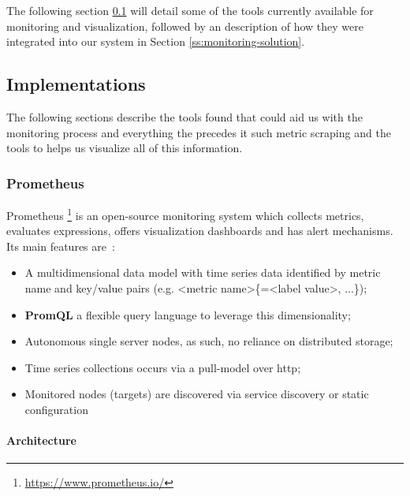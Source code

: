 The following section \ref{ss:monitoring-implementations} will detail some of the tools currently available for monitoring and visualization, followed by an description of how they were integrated into our system in Section \ref{ss:monitoring-solution}.


\subsection{Implementations}
\label{ss:monitoring-implementations}

The following sections describe the tools found that could aid us with the monitoring process and everything the precedes it such metric scraping and the tools to helps us visualize all of this information.

\subsubsection{Prometheus}
\label{sss:prometheus}

Prometheus \footnote{\url{https://www.prometheus.io/}} is an open-source monitoring system which collects metrics, evaluates expressions, offers visualization dashboards and has alert mechanisms. Its main features are~\cite{prometheus-overview}:

\begin{itemize}
    \item A multidimensional data model with time series data identified by metric name and key/value pairs (e.g. <metric name>\{<label name>=<label value>, ...\});
    \item \textbf{PromQL} a flexible query language to leverage this dimensionality;
    \item Autonomous single server nodes, as such, no reliance on distributed storage;
    \item Time series collections occurs via a \gls{pull-model} over \acrshort{http};
    \item Monitored nodes (targets) are discovered via service discovery or static configuration
\end{itemize}

\paragraph{Architecture}

